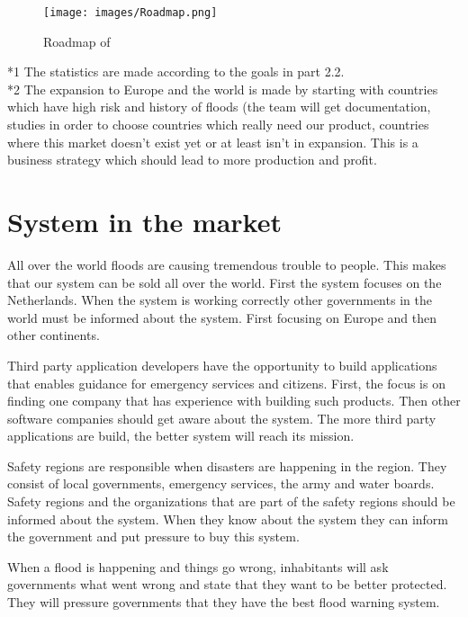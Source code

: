 \begin{figure}[H]
	\centering
	\texttt{[image: images/Roadmap.png]}
	\caption{Roadmap of \CompanyName{}}
	\label{fig:roadmap}
\end{figure}

*1 The statistics are made according to the goals in part 2.2. \\
*2 The expansion to Europe and the world is made by starting with countries which have high risk and history of floods (the team will get documentation, studies in order to choose countries which really need our product, countries where this market doesn't exist yet or at least isn't in expansion. This is a business strategy which should lead to more production and profit.\\

\section{System in the market}
All over the world floods are causing tremendous trouble to people. This makes that our system can be sold all over the world. First the system focuses on the Netherlands. When the system is working correctly other governments in the world must be informed about the system. First focusing on Europe and then other continents.

Third party application developers have the opportunity to build applications that enables guidance for emergency services and citizens. First, the focus is on finding one company that has experience with building such products. Then other software companies should get aware about the system. The more third party applications are build, the better system will reach its mission.

Safety regions are responsible when disasters are happening in the region. They consist of local governments, emergency services, the army and water boards. Safety regions and the organizations that are part of the safety regions should be informed about the system. When they know about the system they can inform the government and put pressure to buy this system.

When a flood is happening and things go wrong, inhabitants will ask governments what went wrong and state that they want to be better protected. They will pressure governments that they have the best flood warning system.

